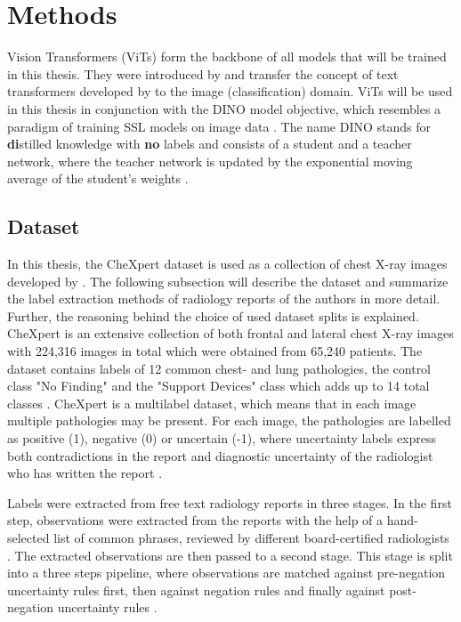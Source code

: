 \section{Methods}
Vision Transformers (ViTs) form the backbone of all models that will be trained in this thesis.
They were introduced by \citep{Dosovitskiy2020} and transfer the concept of text transformers developed by \citep{Vaswani2017} to the image (classification) domain.
ViTs will be used in this thesis in conjunction with the DINO model objective, which resembles a paradigm of training SSL models on image data \citep{Caron2021}.
The name DINO stands for \textbf{di}stilled knowledge with \textbf{no} labels and consists of a student and a teacher network, where the teacher network is updated by the exponential moving average of the student's weights \citep{Caron2021}.
\subsection{Dataset}
In this thesis, the CheXpert dataset is used as a collection of chest X-ray images developed by \citep{Irvin2019}.
The following subsection will describe the dataset and summarize the label extraction methods of radiology reports of the authors in more detail.
Further, the reasoning behind the choice of used dataset splits is explained. 
CheXpert is an extensive collection of both frontal and lateral chest X-ray images with 224,316 images in total which were obtained from 65,240 patients.
The dataset contains labels of 12 common chest- and lung pathologies, the control class "No Finding" and the "Support Devices" class which adds up to 14 total classes \citep{Irvin2019}.
CheXpert is a multilabel dataset, which means that in each image multiple pathologies may be present.
For each image, the pathologies are labelled as positive (1), negative (0) or uncertain (-1), where uncertainty labels express both contradictions in the report and diagnostic uncertainty of the radiologist who has written the report \citep{Irvin2019}.
\par
Labels were extracted from free text radiology reports in three stages.
In the first step, observations were extracted from the reports with the help of a hand-selected list of common phrases, reviewed by different board-certified radiologists \citep{Irvin2019}.
The extracted observations are then passed to a second stage.
This stage is split into a three steps pipeline, where observations are matched against pre-negation uncertainty rules first, then against negation rules and finally against post-negation uncertainty rules \citep{Irvin2019}.
